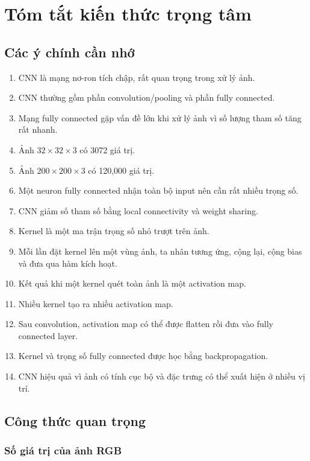\documentclass[12pt,a4paper]{report}
\begin{document}
\chapter{Tóm tắt kiến thức trọng tâm}

\section{Các ý chính cần nhớ}

\begin{enumerate}
    \item CNN là mạng nơ-ron tích chập, rất quan trọng trong xử lý ảnh.
    \item CNN thường gồm phần convolution/pooling và phần fully connected.
    \item Mạng fully connected gặp vấn đề lớn khi xử lý ảnh vì số lượng tham số tăng rất nhanh.
    \item Ảnh $32\times32\times3$ có 3072 giá trị.
    \item Ảnh $200\times200\times3$ có 120,000 giá trị.
    \item Một neuron fully connected nhận toàn bộ input nên cần rất nhiều trọng số.
    \item CNN giảm số tham số bằng local connectivity và weight sharing.
    \item Kernel là một ma trận trọng số nhỏ trượt trên ảnh.
    \item Mỗi lần đặt kernel lên một vùng ảnh, ta nhân tương ứng, cộng lại, cộng bias và đưa qua hàm kích hoạt.
    \item Kết quả khi một kernel quét toàn ảnh là một activation map.
    \item Nhiều kernel tạo ra nhiều activation map.
    \item Sau convolution, activation map có thể được flatten rồi đưa vào fully connected layer.
    \item Kernel và trọng số fully connected được học bằng backpropagation.
    \item CNN hiệu quả vì ảnh có tính cục bộ và đặc trưng có thể xuất hiện ở nhiều vị trí.
\end{enumerate}

\section{Công thức quan trọng}

\subsection*{Số giá trị của ảnh RGB}
\end{document}
